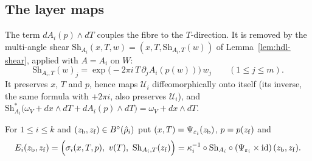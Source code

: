 \subsection{The layer maps}\label{sec:str-layer-maps}

The term $dA_i(p)\wedge dT$ couples the fibre to the $T$-direction. It is removed by the multi-angle shear
$\mathrm{Sh}_{A_i}(x,T,w)=(x,T,\mathrm{Sh}_{A_i,T}(w))$ of Lemma~\ref{lem:hdl-shear}, applied with $A=A_i$ on $W$:
\[
 \mathrm{Sh}_{A_i,T}(w)_j=\exp\big(-2\pi i\,T\,\partial_jA_i(p(w))\big)\,w_j\qquad(1\le j\le m).
\]
It preserves $x$, $T$ and $p$, hence maps $\mathcal U_i$ diffeomorphically onto itself (its inverse, the same formula with
$+2\pi i$, also preserves $\mathcal U_i$), and
$\mathrm{Sh}_{A_i}^*\big(\omega_V+dx\wedge dT+dA_i(p)\wedge dT\big)=\omega_V+dx\wedge dT$.

\begin{construction}\label{cons:str-layer-map}
For $1\le i\le k$ and $(z_{\rm b},z_{\rm f})\in B^{\circ}(\hat\rho_i)$ put $(x,T)=\Psi_{\varepsilon_i}(z_{\rm b})$, $p=p(z_{\rm f})$ and
\[
 E_i(z_{\rm b},z_{\rm f})=\Big(\sigma_i(x,T,p),\ v(T),\ \mathrm{Sh}_{A_i,T}(z_{\rm f})\Big)
 =\kappa_i^{-1}\circ\mathrm{Sh}_{A_i}\circ(\Psi_{\varepsilon_i}\times\mathrm{id})\,(z_{\rm b},z_{\rm f}) .
\]
\end{construction}

